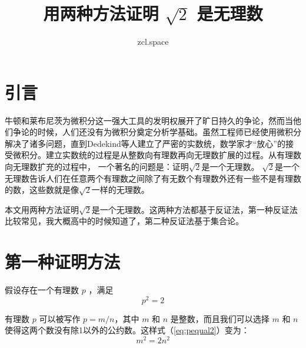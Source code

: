 \documentclass[10pt,a4paper,UTF8]{article}
\author{zcl.space}
\date{}
\title{用两种方法证明 \(\sqrt{2}\) 是无理数}
\begin{document}
\maketitle
\tableofcontents
{}

\section{引言}
\label{sec:orgba4bfa4}


牛顿和莱布尼茨为微积分这一强大工具的发明权展开了旷日持久的争论，然而当他们争论的时候，人们还没有为微积分奠定分析学基础。虽然工程师已经使用微积分解决了诸多问题，直到Dedekind等人建立了严密的实数统，数学家才“放心”的接受微积分。建立实数统的过程是从整数向有理数再向无理数扩展的过程。从有理数向无理数扩充的过程中， 一个著名的问题是：证明\(\sqrt{2}\)是一个无理数。 \(\sqrt{2}\)是一个无理数告诉人们在任意两个有理数之间除了有无数个有理数外还有一些不是有理数的数，这些数就是像\(\sqrt{2}\)一样的无理数。

本文用两种方法证明\(\sqrt{2}\)是一个无理数。这两种方法都基于反证法，第一种反证法比较常见，我大概高中的时候知道了，第二种反证法基于集合论。
\section{第一种证明方法}
\label{sec:org582964e}


假设存在一个有理数 \(p\) ，满足
\begin{equation}
\label{eq:pequal2}
p^{2} = 2
\end{equation}

有理数 \(p\) 可以被写作 \(p=m/n\)，其中 \(m\) 和 \(n\) 是整数，而且我们可以选择 \(m\) 和 \(n\)使得这两个数没有除1以外的公约数。这样式（\ref{eq:pequal2}）变为：
\begin{equation}
\label{eq:2}
m^{2} = 2n^{2}
\end{equation}
\end{document}
